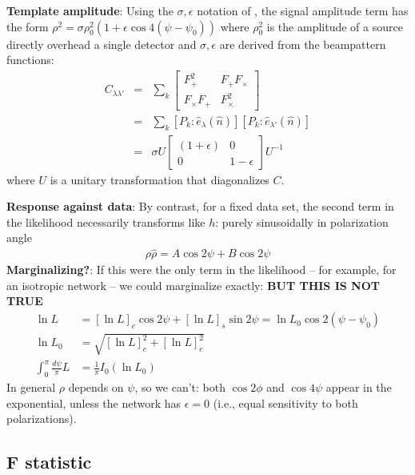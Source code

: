 \documentclass[twocolumn,prd,nofootinbib]{revtex4}
\begin{document}
\begin{shaded}
\noindent \textbf{Template amplitude}: Using the $\sigma,\epsilon$ notation of \citet{CutlerFlanagan:1994}, the signal amplitude term has the form $\rho^2 = \sigma
\rho_0^2(1+\epsilon \cos 4(\psi-\psi_0))$ where $\rho_0^2$ is the amplitude of a source directly overhead a single
detector and $\sigma,\epsilon$ are derived from the beampattern functions:
\begin{eqnarray}
C_{\lambda \lambda'}&=& \sum_k \begin{bmatrix}
F_+^2 & F_+F_\times \\
F_\times F_+ & F_\times^2
\end{bmatrix}\\
&=& \sum_k [P_k : \hat{e}_\lambda(\hat{n})] [P_k : \hat{e}_{\lambda'}(\hat{n})]  \nonumber \\
& =& \sigma U\begin{bmatrix} (1+\epsilon) & 0 \\ 0 & 1-\epsilon \end{bmatrix} U^{-1} 
\end{eqnarray}
where $U$ is a unitary transformation that diagonalizes $C$.

\noindent \textbf{Response against data}: By contrast, for a fixed data set, the second term in the likelihood
necessarily transforms like $h$: purely sinusoidally in polarization angle
\begin{eqnarray}
\rho \hat{\rho} = A \cos 2\psi + B \cos 2 \psi
\end{eqnarray}
\noindent \textbf{Marginalizing?}: If this were the only term in the likelihood -- for example, for an isotropic network
--  we could marginalize exactly: \textbf{BUT THIS IS NOT TRUE}
\begin{align}
\ln L  &= [\ln L]_c \cos 2\psi + [\ln L]_s \sin 2\psi = \ln L_0 \cos 2(\psi-\psi_0)  \\
\ln L_0 &= \sqrt{[\ln L]_c^2+[\ln L]_c^2} \\
\int_0^{\pi}\frac{ d\psi}{\pi} L &= \frac{1}{\pi}I_0(\ln L_0)
\end{align}
In general $\rho$ depends on $\psi$, so we can't: both $\cos 2\phi$ and $\cos 4\psi$ appear in the exponential, unless
the network has $\epsilon=0$ (i.e., equal sensitivity to both polarizations).
\end{shaded}



\subsection{F statistic}
\end{document}

